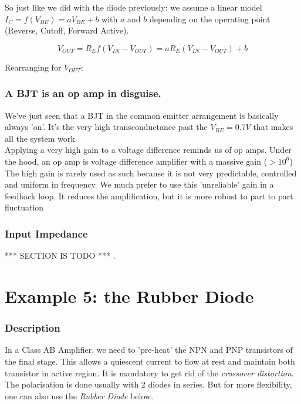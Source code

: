 \documentclass[10pt]{article}
\begin{document}
So just like we did with the diode previously: we assume a linear model $I_C = f(V_{BE}) = a V_{BE} + b$ with $a$ and $b$ depending on the operating point (Reverse, Cutoff, Forward Active).

$$
	V_{OUT} = R_E f(V_{IN} - V_{OUT}) = a R_E \left(V_{IN} - V_{OUT} \right) + b
$$

Rearranging for $V_{OUT}$:




\subsubsection*{A BJT is an op amp in disguise.}
We've just seen that a BJT in the common emitter arrangement is basically always 'on'. It's the very high transconductance past the $V_{BE} = 0.7V$ that makes all the system work.\\
Applying a very high gain to a voltage difference reminds us of op amps. Under the hood, an op amp is voltage difference amplifier with a massive gain ($>10^6$)\\
The high gain is rarely used as such because it is not very predictable, controlled and uniform in frequency. 
We much prefer to use this 'unreliable' gain in a feedback loop. It reduces the amplification, but it is more robust to part to part fluctuation

\subsubsection*{Input Impedance}
*** SECTION IS TODO *** .



\section*{Example 5: the Rubber Diode}

\subsubsection*{Description}
In a Class AB Amplifier, we need to 'pre-heat' the NPN and PNP transistors of the final stage.
This allows a quiescent current to flow at rest and maintain both transistor in active region. 
It is mandatory to get rid of the \textit{crossover distortion}.\\

The polarisation is done usually with 2 diodes in series. 
But for more flexibility, one can also use the \textit{Rubber Diode} below.\\
\end{document}
